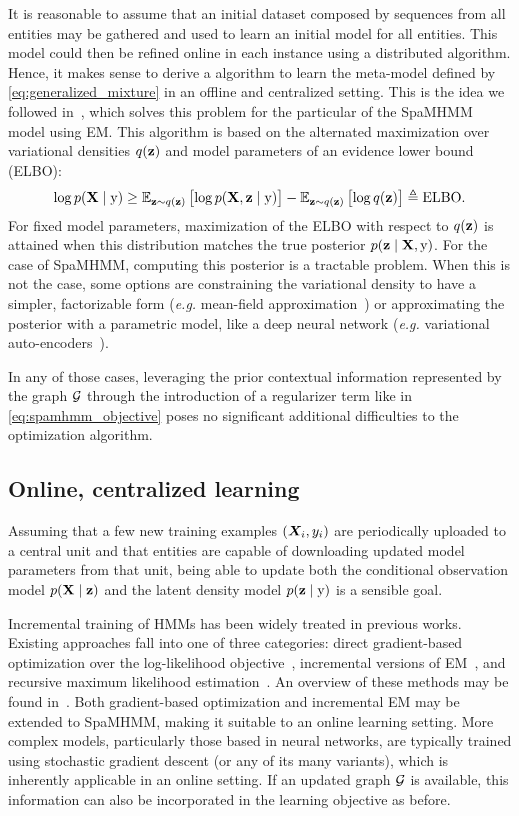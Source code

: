 It is reasonable to assume that an initial dataset composed by sequences from all entities may be gathered and used to learn an initial model for all entities. This model could then be refined online in each instance using a distributed algorithm. Hence, it makes sense to derive a algorithm to learn the meta-model defined by \eqref{eq:generalized_mixture} in an offline and centralized setting. This is the idea we followed in~\cite{SpaMHMM}, which solves this problem for the particular of the SpaMHMM model using EM. This algorithm is based on the alternated maximization over variational densities $q({\mathbf{z}})$ and model parameters of an evidence lower bound (ELBO):
\begin{equation}
\log p({\mathbf{X}} \mid {\textnormal{y}}) \geq \mathbb{E}_{{\mathbf{z}} \sim q({\mathbf{z}})}\left[ \log p({\mathbf{X}}, {\mathbf{z}} \mid {\textnormal{y}}) \right] - \mathbb{E}_{{\mathbf{z}} \sim q({\mathbf{z}})}\left[ \log q({\mathbf{z}}) \right] \triangleq \mathrm{ELBO}.
\end{equation}
For fixed model parameters, maximization of the ELBO with respect to $q({\mathbf{z}})$ is attained when this distribution matches the true posterior $p({\mathbf{z}} \mid {\mathbf{X}},{\textnormal{y}})$. For the case of SpaMHMM, computing this posterior is a tractable problem. When this is not the case, some options are constraining the variational density to have a simpler, factorizable form (\textit{e.g.} mean-field approximation~\cite{Blei2003}) or approximating the posterior with a parametric model, like a deep neural network (\textit{e.g.} variational auto-encoders~\cite{Kingma2013}).

In any of those cases, leveraging the prior contextual information represented by the graph ${\mathcal{G}}$ through the introduction of a regularizer term like in \eqref{eq:spamhmm_objective} poses no significant additional difficulties to the optimization algorithm.

\subsection{Online, centralized learning}
\label{sec:online_learning}

Assuming that a few new training examples $({\bm{X}}_i,y_i)$ are periodically uploaded to a central unit and that entities are capable of downloading updated model parameters from that unit, being able to update both the conditional observation model $p({\mathbf{X}} \mid {\mathbf{z}})$ and the latent density model $p({\mathbf{z}} \mid {\textnormal{y}})$ is a sensible goal.

Incremental training of HMMs has been widely treated in previous works. Existing approaches fall into one of three categories: direct gradient-based optimization over the log-likelihood objective~\cite{Baldi1994}, incremental versions of EM~\cite{Digalakis1999, Mongillo2008}, and recursive maximum likelihood estimation~\cite{Ryden1997}. An overview of these methods may be found in~\cite{Khreich2012}. Both gradient-based optimization and incremental EM may be extended to SpaMHMM, making it suitable to an online learning setting. More complex models, particularly those based in neural networks, are typically trained using stochastic gradient descent (or any of its many variants), which is inherently applicable in an online setting. If an updated graph ${\mathcal{G}}$ is available, this information can also be incorporated in the learning objective as before.

